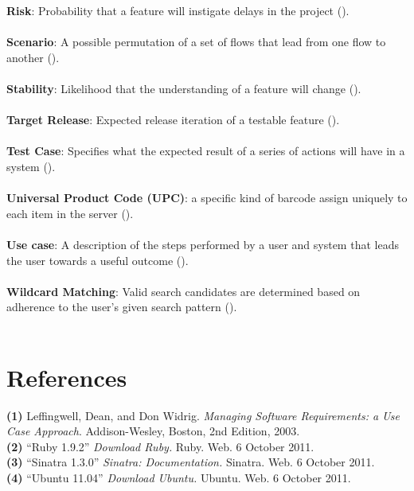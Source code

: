 \documentclass{article}
\begin{document}
\textbf{Risk}: Probability that a feature will instigate delays in the project (\pageref{feature}).\\ \\
\textbf{Scenario}: A possible permutation of a set of flows that lead from one flow to another (\pageref{scenario}).\\ \\
\textbf{Stability}: Likelihood that the understanding of a feature will change (\pageref{feature}).\\ \\
\textbf{Target Release}: Expected release iteration of a testable feature (\pageref{feature}).\\ \\
\textbf{Test Case}: Specifies what the expected result of a series of actions will have in a system (\pageref{test_case}).\\ \\
\textbf{Universal Product Code (UPC)}: a specific kind of barcode assign uniquely to each item in the server (\pageref{upc}).\\ \\
\textbf{Use case}: A description of the steps performed by a user and system that leads the user towards a useful outcome (\pageref{use_case}).\\ \\
\textbf{Wildcard Matching}: Valid search candidates are determined based on adherence to the user's given search pattern (\pageref{feature}).\\ \\

\section{References}
\hangindent=1.4cm
\textbf{(1)} Leffingwell, Dean, and Don Widrig.
\emph{Managing Software Requirements: a Use Case Approach}.
Addison-Wesley, Boston,
2nd Edition,
2003.\\

\noindent\hangindent=1.4cm
\textbf{(2)} ``Ruby 1.9.2''
\emph{Download Ruby.} Ruby. Web.  6 October 2011. \\

\noindent\hangindent=1.4cm
\textbf{(3)} ``Sinatra 1.3.0''
\emph{Sinatra: Documentation.} Sinatra. Web.  6 October 2011.\\

\noindent\hangindent=1.4cm
\textbf{(4)} ``Ubuntu 11.04''
\emph{Download Ubuntu.} Ubuntu. Web.  6 October 2011.\\
\end{document}
